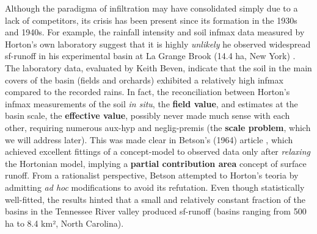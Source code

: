 \documentclass[./main_en.tex]{subfiles}
\begin{document}
\par Although the \gls{paradigma} of infiltration may have consolidated simply due to a lack of competitors, its crisis has been present since its formation in the 1930s and 1940s. For example, the rainfall intensity and soil \gls{infmax} data measured by Horton’s own laboratory suggest that it is highly \textit{unlikely} he observed widespread \gls{sf-runoff} in his experimental basin at La Grange Brook (14.4 ha, New York) \cite{Beven2004c}. The laboratory data, evaluated by Keith Beven, indicate that the soil in the main covers of the basin (fields and orchards) exhibited a relatively high \gls{infmax} compared to the recorded rains. In fact, the reconciliation between Horton’s \gls{infmax} measurements of the soil \textit{in situ}, the \textbf{field value}, and estimates at the basin scale, the \textbf{effective value}, possibly never made much sense with each other, requiring numerous \gls{aux-hyp} and \gls{neglig-premis} (the \textbf{scale problem}, which we will address later). This was made clear in Betson's (1964) article \cite{Betson1964}, which achieved excellent fittings of a \gls{concept-model} to observed data only after \textit{relaxing} the Hortonian \gls{model}, implying a \textbf{partial contribution area} concept of surface runoff. From a rationalist perspective, Betson attempted to  Horton’s \gls{teoria} by admitting \textit{ad hoc} modifications to avoid its refutation. Even though statistically well-fitted, the results hinted that a small and relatively constant fraction of the basins in the Tennessee River valley produced \gls{sf-runoff} (basins ranging from 500 ha to 8.4 km², North Carolina).
\end{document}

